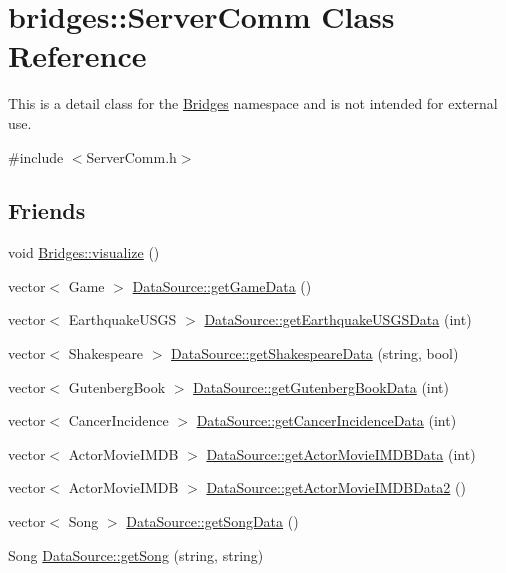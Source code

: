 \hypertarget{classbridges_1_1_server_comm}{}\section{bridges\+:\+:Server\+Comm Class Reference}
\label{classbridges_1_1_server_comm}


This is a detail class for the \mbox{\hyperlink{namespacebridges_1_1_bridges}{Bridges}} namespace and is not intended for external use.  




{\ttfamily \#include $<$Server\+Comm.\+h$>$}

\subsection*{Friends}
\begin{DoxyCompactItemize}
\item 
void \mbox{\hyperlink{classbridges_1_1_server_comm_a0a9e3be9faab475909293766dcda4779}{Bridges\+::visualize}} ()
\item 
vector$<$ Game $>$ \mbox{\hyperlink{classbridges_1_1_server_comm_aaf9715981dcd976f93624bd3aa22183f}{Data\+Source\+::get\+Game\+Data}} ()
\item 
vector$<$ Earthquake\+U\+S\+GS $>$ \mbox{\hyperlink{classbridges_1_1_server_comm_a465a9593399d31b531e61b878a8134b2}{Data\+Source\+::get\+Earthquake\+U\+S\+G\+S\+Data}} (int)
\item 
vector$<$ Shakespeare $>$ \mbox{\hyperlink{classbridges_1_1_server_comm_a1f240eea3d39812606c0b3d10bdc757c}{Data\+Source\+::get\+Shakespeare\+Data}} (string, bool)
\item 
vector$<$ Gutenberg\+Book $>$ \mbox{\hyperlink{classbridges_1_1_server_comm_a8daad6bf2db8bf4f0b0f9914022b6aa4}{Data\+Source\+::get\+Gutenberg\+Book\+Data}} (int)
\item 
vector$<$ Cancer\+Incidence $>$ \mbox{\hyperlink{classbridges_1_1_server_comm_a206da9499372409063d2abe5d1e9bce0}{Data\+Source\+::get\+Cancer\+Incidence\+Data}} (int)
\item 
vector$<$ Actor\+Movie\+I\+M\+DB $>$ \mbox{\hyperlink{classbridges_1_1_server_comm_aeea4f9e05ded118d657ac8ba9e66f22d}{Data\+Source\+::get\+Actor\+Movie\+I\+M\+D\+B\+Data}} (int)
\item 
vector$<$ Actor\+Movie\+I\+M\+DB $>$ \mbox{\hyperlink{classbridges_1_1_server_comm_a19c19c0812754ec276dabbf88d5cedaf}{Data\+Source\+::get\+Actor\+Movie\+I\+M\+D\+B\+Data2}} ()
\item 
vector$<$ Song $>$ \mbox{\hyperlink{classbridges_1_1_server_comm_ada47f365ba4e6c3ef6dbca3afdd20b3f}{Data\+Source\+::get\+Song\+Data}} ()
\item 
Song \mbox{\hyperlink{classbridges_1_1_server_comm_a73eb84d47c0786146b4baceb9d208ea3}{Data\+Source\+::get\+Song}} (string, string)
\end{DoxyCompactItemize}


